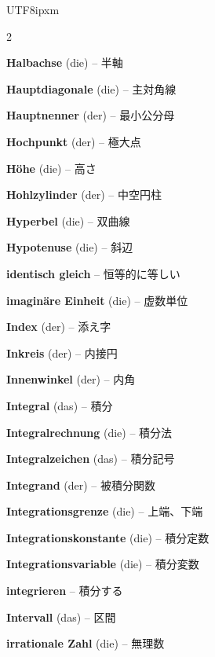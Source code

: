 \begin{CJK}{UTF8}{ipxm}
\begin{multicols}{2}
\par\nopagebreak
\textbf{Halbachse} (die) -- 半軸\dotfill\hyperref[e:317]{\pageref*{e:317}}\par
\textbf{Hauptdiagonale} (die) -- 主対角線\dotfill\hyperref[e:324]{\pageref*{e:324}}\par
\textbf{Hauptnenner} (der) -- 最小公分母\dotfill\hyperref[e:36]{\pageref*{e:36}}\par
\textbf{Hochpunkt} (der) -- 極大点\dotfill\hyperref[e:282]{\pageref*{e:282}}\par
\textbf{Höhe} (die) -- 高さ\dotfill\hyperref[e:191]{\pageref*{e:191}}\par
\textbf{Hohlzylinder} (der) -- 中空円柱\dotfill\hyperref[e:237]{\pageref*{e:237}}\par
\textbf{Hyperbel} (die) -- 双曲線\dotfill\hyperref[e:315]{\pageref*{e:315}}\par
\textbf{Hypotenuse} (die) -- 斜辺\dotfill\hyperref[e:186]{\pageref*{e:186}}\par

\par\nopagebreak
\textbf{identisch gleich} -- 恒等的に等しい\dotfill\hyperref[e:62]{\pageref*{e:62}}\par
\textbf{imaginäre Einheit} (die) -- 虚数単位\dotfill\hyperref[e:11]{\pageref*{e:11}}\par
\textbf{Index} (der) -- 添え字\dotfill\hyperref[e:4]{\pageref*{e:4}}\par
\textbf{Inkreis} (der) -- 内接円\dotfill\hyperref[e:193]{\pageref*{e:193}}\par
\textbf{Innenwinkel} (der) -- 内角\dotfill\hyperref[e:178]{\pageref*{e:178}}\par
\textbf{Integral} (das) -- 積分\dotfill\hyperref[e:295]{\pageref*{e:295}}\par
\textbf{Integralrechnung} (die) -- 積分法\dotfill\hyperref[e:286]{\pageref*{e:286}}\par
\textbf{Integralzeichen} (das) -- 積分記号\dotfill\hyperref[e:289]{\pageref*{e:289}}\par
\textbf{Integrand} (der) -- 被積分関数\dotfill\hyperref[e:290]{\pageref*{e:290}}\par
\textbf{Integrationsgrenze} (die) -- 上端、下端\dotfill\hyperref[e:297]{\pageref*{e:297}}\par
\textbf{Integrationskonstante} (die) -- 積分定数\dotfill\hyperref[e:292]{\pageref*{e:292}}\par
\textbf{Integrationsvariable} (die) -- 積分変数\dotfill\hyperref[e:291]{\pageref*{e:291}}\par
\textbf{integrieren} -- 積分する\dotfill\hyperref[e:296]{\pageref*{e:296}}\par
\textbf{Intervall} (das) -- 区間\dotfill\hyperref[e:270]{\pageref*{e:270}}\par
\textbf{irrationale Zahl} (die) -- 無理数\dotfill\hyperref[e:9]{\pageref*{e:9}}\par


\end{multicols}
\end{CJK}
